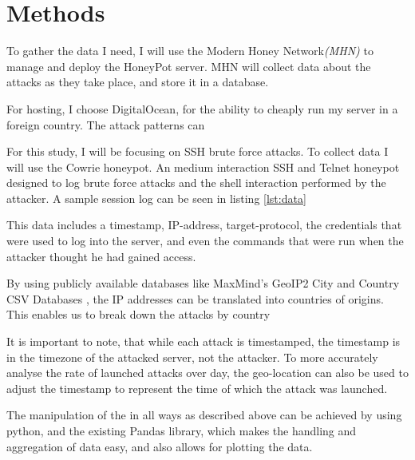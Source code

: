 \section{Methods}
  \label{sec:methods}
  

  To gather the data I need, I will use the Modern Honey 
  Network\textit{(MHN)} to manage 
  and deploy the HoneyPot server. MHN will collect data about
  the attacks as they take place, and store it in a database.

  For hosting, I choose DigitalOcean, for the ability to
  cheaply run my server in a foreign country.
  The attack patterns can 


  For this study, I will be focusing on SSH brute force attacks.
  To collect data I will use the Cowrie\cite{Cowrie}
  honeypot. An medium interaction SSH and Telnet honeypot
  designed to log brute force attacks and the shell 
  interaction performed by the attacker. A sample session 
  log can be seen in listing \ref{lst:data}

  
  This data includes a timestamp, IP-address,
  target-protocol,
  the credentials that were used to log into the 
  server, and even the commands that were run when
  the attacker thought he had gained access.

  
  By using publicly available databases like
  MaxMind's GeoIP2 City and Country CSV Databases
  \cite{maxminds}, the IP addresses can be translated
  into countries of origins.
  This enables us to break down the attacks by country 

  It is important to note, that while each attack is 
  timestamped, the timestamp is in the timezone of the 
  attacked server, not the attacker. To more accurately
  analyse the rate of launched attacks over day, the
  geo-location can also be used to adjust the timestamp
  to represent the time of which the attack was launched.

  
  The manipulation of the in all ways as described above
  can be achieved by using python, and the existing Pandas
  \cite{pandas} library, which makes the handling and
  aggregation of data easy, and also allows for plotting
  the data.


  
